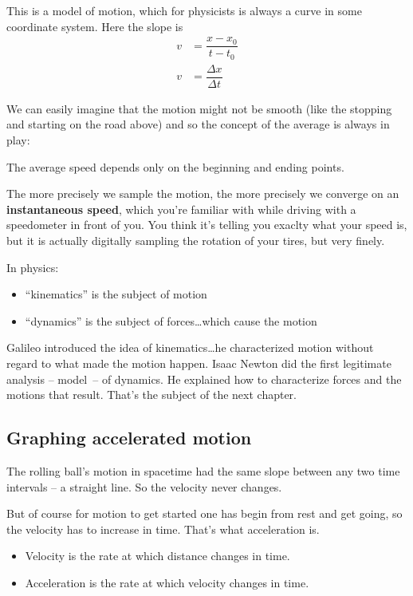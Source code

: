 \documentclass[
  letterpaper,
  DIV=11,
  numbers=noendperiod,
  oneside]{scrreprt}
\providecommand{\tightlist}{%
  \setlength{\itemsep}{0pt}\setlength{\parskip}{0pt}}\usepackage{longtable,booktabs,array}
\begin{document}
This is a model of motion, which for physicists is always a curve in
some coordinate system. Here the slope is \[
\begin{align}
v &=\dfrac{x-x_0}{t-t_0} \nonumber \\
v &= \dfrac{\Delta x}{\Delta t} \nonumber
\end{align}
\]

We can easily imagine that the motion might not be smooth (like the
stopping and starting on the road above) and so the concept of the
average is always in play:

The average speed depends only on the beginning and ending points.

The more precisely we sample the motion, the more precisely we converge
on an \textbf{instantaneous speed}, which you're familiar with while
driving with a speedometer in front of you. You think it's telling you
exaclty what your speed is, but it is actually digitally sampling the
rotation of your tires, but very finely.

In physics:

\begin{itemize}
\tightlist
\item
  ``kinematics'' is the subject of motion
\item
  ``dynamics'' is the subject of forces\ldots which cause the motion
\end{itemize}

Galileo introduced the idea of kinematics\ldots he characterized motion
without regard to what made the motion happen. Isaac Newton did the
first legitimate analysis -- model~-- of dynamics. He explained how to
characterize forces and the motions that result. That's the subject of
the next chapter.

\subsection{Graphing accelerated
motion}\label{graphing-accelerated-motion}

The rolling ball's motion in spacetime had the same slope between any
two time intervals -- a straight line. So the velocity never changes.

But of course for motion to get started one has begin from rest and get
going, so the velocity has to increase in time. That's what acceleration
is.

\begin{itemize}
\tightlist
\item
  Velocity is the rate at which distance changes in time.
\item
  Acceleration is the rate at which velocity changes in time.
\end{itemize}
\end{document}
